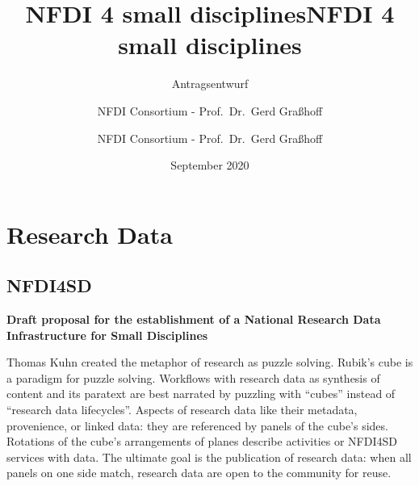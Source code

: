 \documentclass[
  english,
  paper=a4,
  oneside,captions=tableheading
]{scrbook}
\title{NFDI 4 small disciplines}
\subtitle{Antragsentwurf}
\author{NFDI Consortium - Prof.~Dr.~Gerd Graßhoff}
\date{September 2020}
\title{NFDI 4 small disciplines}
\author{NFDI Consortium - Prof.~Dr.~Gerd Graßhoff}
\begin{document}
\begin{titlepage}
\afterpage{\restorepagecolor}
\newcommand{\colorRule}[3][black]{\textcolor[HTML]{#1}{\rule{#2}{#3}}}
\end{titlepage}
\restoregeometry


\frontmatter


{
\hypersetup{linkcolor=}
\setcounter{tocdepth}{2}
\tableofcontents
\newpage
}
\mainmatter
\hypertarget{research-data}{%
\chapter{Research Data}\label{research-data}}

\hypertarget{nfdi4sd}{%
\section{NFDI4SD}\label{nfdi4sd}}

\textbf{Draft proposal for the establishment of a National Research Data
Infrastructure for Small Disciplines}

\hypertarget{observablehq-ee3a293a}{}

Thomas Kuhn created the metaphor of research as puzzle solving. Rubik's
cube is a paradigm for puzzle solving. Workflows with research data as
synthesis of content and its paratext are best narrated by puzzling with
``cubes'' instead of ``research data lifecycles''. Aspects of research
data like their metadata, provenience, or linked data: they are
referenced by panels of the cube's sides. Rotations of the cube's
arrangements of planes describe activities or NFDI4SD services with
data. The ultimate goal is the publication of research data: when all
panels on one side match, research data are open to the community for
reuse.
\end{document}
